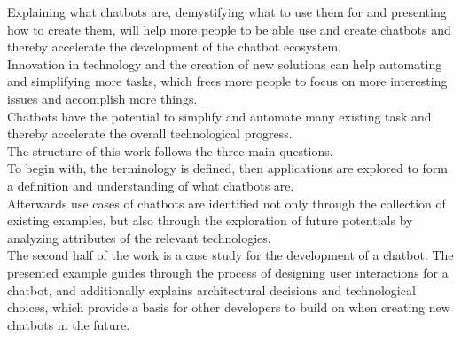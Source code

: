 Explaining what chatbots are, demystifying what to use them for and presenting how to create them,
will help more people to be able use and create chatbots and thereby accelerate the development of the chatbot ecosystem.
\\
Innovation in technology and the creation of new solutions can help automating and simplifying more tasks,
which frees more people to focus on more interesting issues and accomplish more things.
\\
Chatbots have the potential to simplify and automate many existing task and thereby accelerate the overall technological progress.
\\

The structure of this work follows the three main questions.
\\
To begin with, the terminology is defined, then applications are explored to form a definition and understanding of what chatbots are.
\\
Afterwards use cases of chatbots are identified not only through the collection of existing examples, but also through the exploration of future potentials by analyzing attributes of the relevant technologies.
\\
The second half of the work is a case study for the development of a chatbot.
The presented example guides through the process of designing user interactions for a chatbot, and additionally explains architectural decisions and technological choices, which provide a basis for other developers to build on when creating new chatbots in the future.
